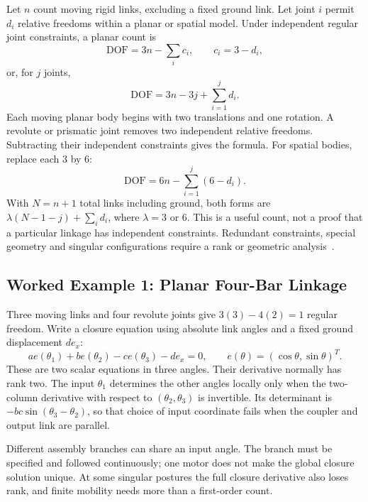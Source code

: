 Let $n$ count moving rigid links, excluding a fixed ground link. Let joint $i$ permit $d_i$ relative freedoms within a planar or spatial model. Under independent regular joint constraints, a planar count is
\begin{equation}
 \mathrm{DOF}=3n-\sum_i c_i,\qquad c_i=3-d_i,
 \label{eq:grubler}
\end{equation}
or, for $j$ joints,
\begin{equation}
 \mathrm{DOF}=3n-3j+\sum_{i=1}^{j}d_i.
 \label{eq:grubler_alt}
\end{equation}
Each moving planar body begins with two translations and one rotation. A revolute or prismatic joint removes two independent relative freedoms. Subtracting their independent constraints gives the formula. For spatial bodies, replace each $3$ by $6$:
\begin{equation}
 \mathrm{DOF}=6n-\sum_{i=1}^{j}(6-d_i).
\end{equation}
With $N=n+1$ total links including ground, both forms are $\lambda(N-1-j)+\sum_i d_i$, where $\lambda=3$ or $6$. This is a useful count, not a proof that a particular linkage has independent constraints. Redundant constraints, special geometry and singular configurations require a rank or geometric analysis~\cite{Lynch2017}.

\subsection{Worked Example 1: Planar Four-Bar Linkage}
\label{example:4bar}
\label{ex:ex_4bar}

Three moving links and four revolute joints give $3(3)-4(2)=1$ regular freedom. Write a closure equation using absolute link angles and a fixed ground displacement $d e_x$:
\begin{equation}
 a e(\theta_1)+b e(\theta_2)-c e(\theta_3)-d e_x=0,
 \qquad e(\theta)=(\cos\theta,\sin\theta)^T.
\end{equation}
These are two scalar equations in three angles. Their derivative normally has rank two. The input $\theta_1$ determines the other angles locally only when the two-column derivative with respect to $(\theta_2,\theta_3)$ is invertible. Its determinant is $-bc\sin(\theta_3-\theta_2)$, so that choice of input coordinate fails when the coupler and output link are parallel.

Different assembly branches can share an input angle. The branch must be specified and followed continuously; one motor does not make the global closure solution unique. At some singular postures the full closure derivative also loses rank, and finite mobility needs more than a first-order count.

